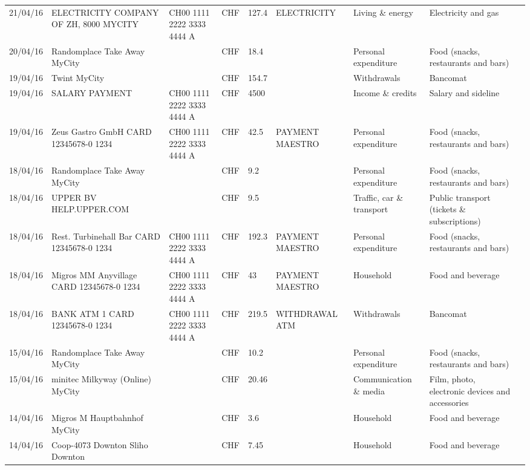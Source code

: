 \begin{landscape}
\begin{tiny}
\begin{longtable}{lp{4cm}llllp{3cm}ll}
		    21/04/16 & ELECTRICITY COMPANY OF ZH, 8000 MYCITY & CH00 1111 2222 3333 4444 A & CHF   & 127.4 & ELECTRICITY & Living \& energy & Electricity and gas \\
		    20/04/16 & Randomplace Take Away     MyCity &       & CHF   & 18.4  &       & Personal expenditure & Food (snacks, restaurants and bars) \\
		    19/04/16 & Twint               MyCity &       & CHF   & 154.7 &       & Withdrawals & Bancomat \\
		    19/04/16 & SALARY PAYMENT & CH00 1111 2222 3333 4444 A & CHF   & 4500  &       & Income \& credits & Salary and sideline \\
		    19/04/16 & Zeus Gastro GmbH CARD 12345678-0 1234 & CH00 1111 2222 3333 4444 A & CHF   & 42.5  & PAYMENT MAESTRO & Personal expenditure & Food (snacks, restaurants and bars) \\
		    18/04/16 & Randomplace Take Away     MyCity &       & CHF   & 9.2   &       & Personal expenditure & Food (snacks, restaurants and bars) \\
		    18/04/16 & UPPER BV                  HELP.UPPER.COM &       & CHF   & 9.5   &       & Traffic, car \& transport & Public transport (tickets \& subscriptions) \\
		    18/04/16 & Rest. Turbinehall Bar CARD 12345678-0 1234 & CH00 1111 2222 3333 4444 A & CHF   & 192.3 & PAYMENT MAESTRO & Personal expenditure & Food (snacks, restaurants and bars) \\
		    18/04/16 & Migros MM Anyvillage CARD 12345678-0 1234 & CH00 1111 2222 3333 4444 A & CHF   & 43    & PAYMENT MAESTRO & Household & Food and beverage \\
		    18/04/16 & BANK ATM 1 CARD 12345678-0 1234 & CH00 1111 2222 3333 4444 A & CHF   & 219.5 & WITHDRAWAL ATM & Withdrawals & Bancomat \\
		    15/04/16 & Randomplace Take Away     MyCity &       & CHF   & 10.2  &       & Personal expenditure & Food (snacks, restaurants and bars) \\
		    15/04/16 & minitec Milkyway (Online) MyCity &       & CHF   & 20.46 &       & Communication \& media & Film, photo, electronic devices and accessories \\
		    14/04/16 & Migros M Hauptbahnhof    MyCity &       & CHF   & 3.6   &       & Household & Food and beverage \\
		    14/04/16 & Coop-4073 Downton Sliho   Downton &       & CHF   & 7.45  &       & Household & Food and beverage \\

\end{longtable}
\end{tiny}
\end{landscape}
